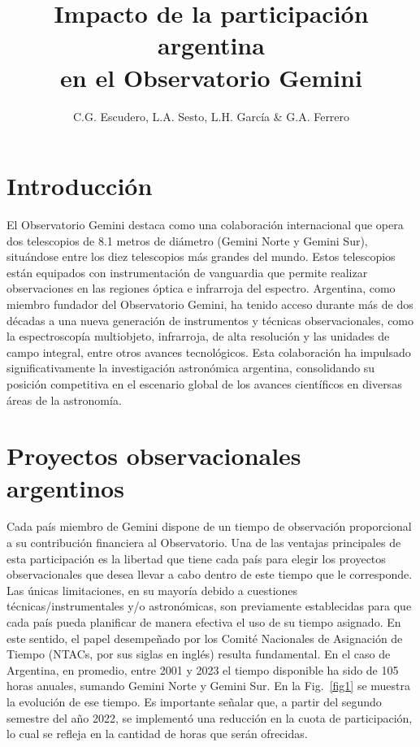 \documentclass[baaa]{baaa}
\title{Impacto de la participación argentina \\
en el Observatorio Gemini}
\author{
C.G. Escudero\inst{1,2},
L.A. Sesto\inst{1,2},
L.H. García\inst{3}
\&
G.A. Ferrero\inst{1,2}
}
\institute{
Instituto de Astrof\'isica de La Plata, CONICET–UNLP, Argentina
\and
Facultad de Ciencias Astron\'omicas y Geof{\'\i}sicas, UNLP, Argentina
\and   
Observatorio Astron\'omico de C\'ordoba, UNC, Argentina
}
\begin{document}
\maketitle
\section{Introducción}\label{S_intro}
El Observatorio Gemini destaca como una colaboración internacional que opera dos telescopios de 8.1 metros de diámetro (Gemini Norte y Gemini Sur), situándose entre los diez telescopios más grandes del mundo. Estos telescopios están equipados con instrumentación de vanguardia que permite realizar observaciones en las regiones óptica e infrarroja del espectro. Argentina, como miembro fundador del Observatorio Gemini, ha tenido acceso durante más de dos décadas a una nueva generación de instrumentos y técnicas observacionales, como la espectroscopía multiobjeto, infrarroja, de alta resolución y las unidades de campo integral, entre otros avances tecnológicos. Esta colaboración ha impulsado significativamente la investigación astronómica argentina, consolidando su posición competitiva en el escenario global de los avances científicos en diversas áreas de la astronomía.


\section{Proyectos observacionales argentinos}
Cada país miembro de Gemini dispone de un tiempo de observación proporcional a su contribución financiera al Observatorio. Una de las ventajas principales de esta participación es la libertad que tiene cada país para elegir los proyectos observacionales que desea llevar a cabo dentro de este tiempo que le corresponde. Las únicas limitaciones, en su mayoría debido a cuestiones técnicas/instrumentales y/o astronómicas, son previamente establecidas para que cada país pueda planificar de manera efectiva el uso de su tiempo asignado. En este sentido, el papel desempeñado por los Comité Nacionales de Asignación de Tiempo (NTACs, por sus siglas en inglés) resulta fundamental. En el caso de Argentina, en promedio, entre 2001 y 2023 el tiempo disponible ha sido de 105 horas anuales, sumando Gemini Norte y Gemini Sur. En la Fig.~\ref{fig1} se muestra la evolución de ese tiempo. 
Es importante señalar que, a partir del segundo semestre del año 2022, se implementó una reducción en la cuota de participación, lo cual se refleja en la cantidad de horas que serán ofrecidas. 
\end{document}
